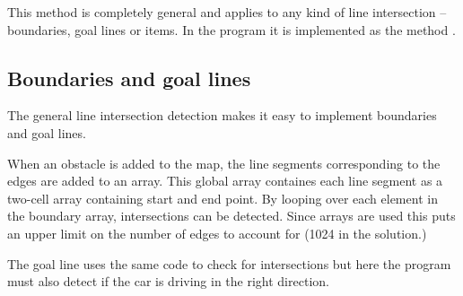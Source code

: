This method is completely general and applies to any kind of line intersection
-- boundaries, goal lines or items. In the program it is implemented as the
method .

\subsection*{Boundaries and goal lines}

The general line intersection detection makes it easy to implement boundaries
and goal lines.

When an obstacle is added to the map, the line segments corresponding to the
edges are added to an array. This global array containes each line segment as
a two-cell array containing start and end point. By looping over each element
in the boundary array, intersections can be detected. Since arrays are used
this puts an upper limit on the number of edges to account for (1024 in the
solution.)

The goal line uses the same code to check for intersections but here the
program must also detect if the car is driving in the right direction.
